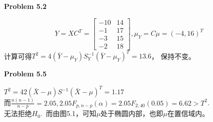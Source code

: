 \documentclass[UTF8,12pt]{article}
\newenvironment{problem}[2][Problem]
{ \begin{mdframed}[backgroundcolor=gray!20] \textbf{#1 #2}}
	{  \end{mdframed}}
\newenvironment{answer}
{}
{}
\begin{document}
\begin{problem}{5.2}
\end{problem}
\begin{answer}
$$
Y=XC^T = \begin{bmatrix}
	-10 & 14\\
	-1 & 17\\
	-3 & 15\\
	-2 & 18
\end{bmatrix},\mu_Y=C\mu=(-4,16)^T
$$
计算可得$T^2=4(\bar{Y}-\mu_Y)S_Y^{-1}(\bar{Y}-\mu_Y)^T=13.6$，
保持不变。
\end{answer}

\begin{problem}{5.5}
\end{problem}
	$T^2=42(\bar{X}-\mu)S^{-1}(\bar{X}-\mu)^T=1.17 
	$\\
	而$\frac{n(n-1)}{n-p}=2.05,
	2.05F_{p,n-p}(\alpha)=2.05F_{2,40}(0.05)=6.62>T^2$.\\
	无法拒绝$H_0$.\ 而由图5.1，可知$\mu$处于椭圆内部，也即$\mu$在置信域内。
\end{document}
